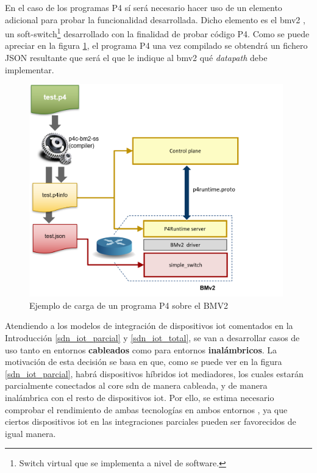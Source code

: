 En el caso de los programas P4 sí será necesario hacer uso de un elemento adicional para probar la funcionalidad desarrollada. Dicho elemento es el \gls{bmv2} \cite{p42018behavioral}, un soft-switch\footnote{ Switch virtual que se implementa a nivel de software.} desarrollado con la finalidad de probar código P4. Como se puede apreciar en la figura \ref{fig:p4_process}, el programa P4 una vez compilado se obtendrá un fichero JSON \cite{json} resultante que será el que le indique al \gls{bmv2} qué \textit{datapath} debe implementar.\\
\par

\begin{figure}[t]
    \centering
    \includegraphics[width=11cm]{archivos/img/analisis/bmv2_process.png}
    \caption{Ejemplo de carga de un programa P4 sobre el BMV2}
    \label{fig:p4_process}
\end{figure}


Atendiendo a los modelos de integración de dispositivos \gls{iot} comentados en la Introducción \ref{sdn_iot_parcial} y \ref{sdn_iot_total}, se van a desarrollar casos de uso tanto en entornos  \textbf{cableados} como para entornos  \textbf{inalámbricos}. La motivación de esta decisión se basa en que, como se puede ver en la figura \ref{sdn_iot_parcial}, habrá dispositivos híbridos \gls{iot} mediadores, los cuales estarán parcialmente conectados al core \gls{sdn} de manera cableada, y de manera inalámbrica con el resto de dispositivos \gls{iot}. Por ello, se estima necesario comprobar el rendimiento de ambas tecnologías en ambos entornos , ya que ciertos dispositivos \gls{iot} en las integraciones parciales pueden ser favorecidos de igual manera. \\
\par

